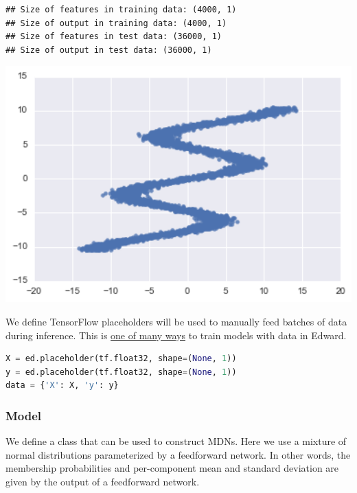 \begin{lstlisting}
## Size of features in training data: (4000, 1)
## Size of output in training data: (4000, 1)
## Size of features in test data: (36000, 1)
## Size of output in test data: (36000, 1)
\end{lstlisting}
\includegraphics[width=700px]{images/mdn-fig0.png}

We define TensorFlow placeholders will be used to manually feed batches of data during inference. This is \href{http://edwardlib.org/api/data}{one of many ways} to train models with data in Edward.

\begin{lstlisting}[language=Python]
X = ed.placeholder(tf.float32, shape=(None, 1))
y = ed.placeholder(tf.float32, shape=(None, 1))
data = {'X': X, 'y': y}
\end{lstlisting}


\subsubsection{Model}

We define a class that can be used to construct MDNs. Here we use a
mixture of normal distributions parameterized by a feedforward
network. In other words, the membership probabilities and
per-component mean and standard deviation are given by the output of a
feedforward network.

